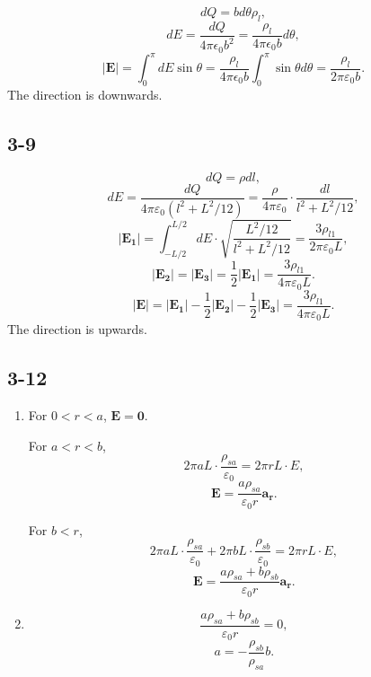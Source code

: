 \documentclass[6pt,a4paper]{article}
\begin{document}
$$dQ=bd\theta\rho_l,$$
$$dE=\frac{dQ}{4\pi\epsilon_0b^2}=\frac{\rho_l}{4\pi\epsilon_0b}d\theta,$$
$$|\mathbf{E}|=\int_0^\pi dE\sin\theta=\frac{\rho_l}{4\pi\epsilon_0b}\int_0^\pi\sin\theta d\theta=\frac{\rho_l}{2\pi\varepsilon_0b}.$$
The direction is downwards.

\subsection{3-9}
\begin{center}
\end{center}

$$dQ=\rho dl,$$
$$dE=\frac{dQ}{4\pi\varepsilon_0(l^2+L^2/12)}=\frac{\rho}{4\pi\varepsilon_0}\cdot\frac{dl}{l^2+L^2/12},$$
$$|\mathbf{E_1}|=\int_{-L/2}^{L/2}dE\cdot\sqrt{\frac{L^2/12}{l^2+L^2/12}}=\frac{3\rho_{l1}}{2\pi\varepsilon_0 L},$$
$$|\mathbf{E_2}|=|\mathbf{E_3}|=\frac{1}{2}|\mathbf{E_1}|=\frac{3\rho_{l1}}{4\pi\varepsilon_0 L}.$$
$$|\mathbf{E}|=|\mathbf{E_1}|-\frac{1}{2}|\mathbf{E_2}|-\frac{1}{2}|\mathbf{E_3}|=\frac{3\rho_{l1}}{4\pi\varepsilon_0 L}.$$
The direction is upwards.

\subsection{3-12}
\begin{enumerate}[label=\alph*)]
\item 
For $0<r<a$, $\mathbf{E}=\mathbf{0}$.

For $a<r<b$, $$2\pi aL\cdot\frac{\rho_{sa}}{\varepsilon_0}=2\pi rL\cdot E,$$
$$\mathbf{E}=\frac{a\rho_{sa}}{\varepsilon_0 r}\mathbf{a_r}.$$

For $b<r$, $$2\pi aL\cdot\frac{\rho_{sa}}{\varepsilon_0}+2\pi bL\cdot\frac{\rho_{sb}}{\varepsilon_0}=2\pi rL\cdot E,$$
$$\mathbf{E}=\frac{a\rho_{sa}+b\rho_{sb}}{\varepsilon_0 r}\mathbf{a_r}.$$
\item
$$\frac{a\rho_{sa}+b\rho_{sb}}{\varepsilon_0 r}=0,$$
$$a=-\frac{\rho_{sb}}{\rho_{sa}}b.$$
\end{enumerate}
\end{document}
